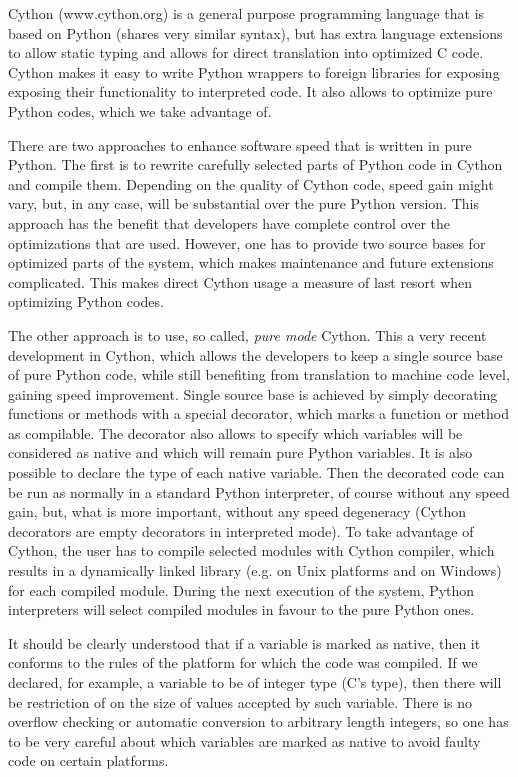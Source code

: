 Cython (www.cython.org) is a general purpose programming language that is based on Python
(shares very similar syntax), but has extra language extensions to allow static typing and
allows for direct translation into optimized C code. Cython makes it easy to write Python
wrappers to foreign libraries for exposing exposing their functionality to interpreted code.
It also allows to optimize pure Python codes, which we take advantage of.

There are two approaches to enhance software speed that is written in pure Python. The first
is to rewrite carefully selected parts of Python code in Cython and compile them. Depending
on the quality of Cython code, speed gain might vary, but, in any case, will be substantial
over the pure Python version. This approach has the benefit that developers have complete
control over the optimizations that are used. However, one has to provide two source bases
for optimized parts of the system, which makes maintenance and future extensions complicated.
This makes direct Cython usage a measure of last resort when optimizing Python codes.

The other approach is to use, so called, \emph{pure mode} Cython. This a very recent development
in Cython, which allows the developers to keep a single source base of pure Python code, while
still benefiting from translation to machine code level, gaining speed improvement. Single source
base is achieved by simply decorating functions or methods with a special decorator, which marks
a function or method as compilable. The decorator also allows to specify which variables will be
considered as native and which will remain pure Python variables. It is also possible to declare
the type of each native variable. Then the decorated code can be run as normally in a standard
Python interpreter, of course without any speed gain, but, what is more important, without any
speed degeneracy (Cython decorators are empty decorators in interpreted mode). To take advantage
of Cython, the user has to compile selected modules with Cython compiler, which results in a
dynamically linked library (e.g.  on Unix platforms and  on Windows) for each
compiled module. During the next execution of the system, Python interpreters will select compiled
modules in favour to the pure Python ones.

It should be clearly understood that if a variable is marked as native, then it conforms to the
rules of the platform for which the code was compiled. If we declared, for example, a variable
to be of integer type (C's  type), then there will be restriction of on the size of values
accepted by such variable. There is no overflow checking or automatic conversion to arbitrary
length integers, so one has to be very careful about which variables are marked as native to
avoid faulty code on certain platforms.


